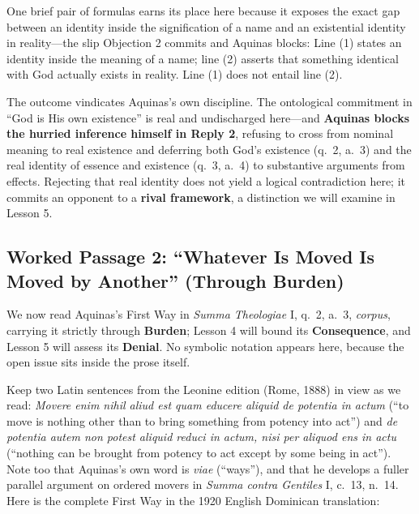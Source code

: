 One brief pair of formulas earns its place here because it exposes the exact gap between an identity inside the signification of a name and an existential identity in reality---the slip Objection 2 commits and Aquinas blocks:
Line (1) states an identity inside the meaning of a name; line (2) asserts that something identical with God actually exists in reality. Line (1) does not entail line (2).

The outcome vindicates Aquinas's own discipline. The ontological commitment in ``God is His own existence'' is real and undischarged here---and \textbf{Aquinas blocks the hurried inference himself in Reply 2}, refusing to cross from nominal meaning to real existence and deferring both God's existence (q.\ 2, a.\ 3) and the real identity of essence and existence (q.\ 3, a.\ 4) to substantive arguments from effects. Rejecting that real identity does not yield a logical contradiction here; it commits an opponent to a \textbf{rival framework}, a distinction we will examine in Lesson 5.

\subsection{Worked Passage 2: ``Whatever Is Moved Is Moved by Another'' (Through Burden)}

We now read Aquinas's First Way in \emph{Summa Theologiae} I, q.\ 2, a.\ 3, \emph{corpus}, carrying it strictly through \textbf{Burden}; Lesson 4 will bound its \textbf{Consequence}, and Lesson 5 will assess its \textbf{Denial}. No symbolic notation appears here, because the open issue sits inside the prose itself.

Keep two Latin sentences from the Leonine edition (Rome, 1888) in view as we read: \emph{Movere enim nihil aliud est quam educere aliquid de potentia in actum} (``to move is nothing other than to bring something from potency into act'') and \emph{de potentia autem non potest aliquid reduci in actum, nisi per aliquod ens in actu} (``nothing can be brought from potency to act except by some being in act''). Note too that Aquinas's own word is \emph{viae} (``ways''), and that he develops a fuller parallel argument on ordered movers in \emph{Summa contra Gentiles} I, c.\ 13, n.\ 14. Here is the complete First Way in the 1920 English Dominican translation:

